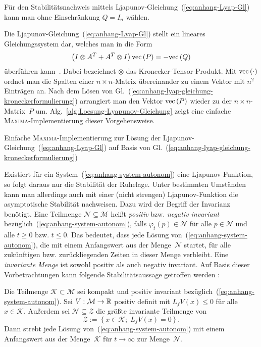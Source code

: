 Für den Stabilitätsnachweis mittels Ljapunov-Gleichung~(\ref{eq:anhang-Lyap-Gl})
kann man ohne Einschränkung $Q=I_{n}$ wählen.
\begin{remark}
Die Ljapunov-Gleichung~(\ref{eq:anhang-Lyap-Gl}) stellt ein lineares
Gleichungssystem dar, welches man in die Form 
\begin{equation}
\left(I\otimes A^{T}+A^{T}\otimes I\right){\mathrm{vec}\,}(P)=-{\mathrm{vec}\,}(Q)\label{eq:anhang-lyap-gleichung-kroneckerformulierung}
\end{equation}
überführen kann~\cite{marcusminc1992}. Dabei bezeichnet $\otimes$
das Kronecker-Tensor-Produkt. Mit ${\mathrm{vec}\,}(\cdot)$ ordnet man die Spalten
einer $n\times n$-Matrix übereinander zu einem Vektor mit $n^{2}$
Einträgen an. Nach dem Lösen von Gl.~(\ref{eq:anhang-lyap-gleichung-kroneckerformulierung})
arrangiert man den Vektor ${\mathrm{vec}\,}(P)$ wieder zu der $n\times n$-Matrix~$P$
um. Alg.~\ref{alg:Loesung-Lyapunov-Gleichung} zeigt eine einfache
\textsc{Maxima}-Implementierung dieser Vorgehensweise.
\end{remark}
\begin{algorithm}
\begin{raggedright}

\par\end{raggedright}
\caption{Einfache \textsc{Maxima}-Implementierung zur Lösung der Ljapunov-Gleichung~(\ref{eq:anhang-Lyap-Gl})\label{alg:Loesung-Lyapunov-Gleichung}
auf Basis von Gl.~(\ref{eq:anhang-lyap-gleichung-kroneckerformulierung})}

\end{algorithm}

Existiert für ein System~(\ref{eq:anhang-system-autonom}) eine Ljapunov-Funktion,
so folgt daraus nur die Stabilität der Ruhelage. Unter bestimmten
Umständen kann man allerdings auch mit einer (nicht strengen) Ljapunov-Funktion
die asymptotische Stabilität nachweisen. Dazu wird der Begriff der
Invarianz benötigt. Eine Teilmenge $\mathcal{N\subseteq\mathcal{M}}$
heißt \emph{positiv} bzw. \emph{negativ invariant} bezüglich~(\ref{eq:anhang-system-autonom}),
falls $\varphi_{t}(p)\in\mathcal{N}$ für alle $p\in\mathcal{N}$
und alle $t\geq0$ bzw. $t\leq0$. Das bedeutet, dass jede Lösung
von~(\ref{eq:anhang-system-autonom}), die mit einem Anfangswert
aus der Menge~$\mathcal{N}$ startet, für alle zukünftigen bzw. zurückliegenden
Zeiten in dieser Menge verbleibt. Eine \emph{invariante Menge}
ist sowohl positiv als auch negativ invariant. Auf Basis dieser Vorbetrachtungen
kann folgende Stabilitätsaussage getroffen werden \cite{slotine1991,khalil2002}:
\begin{theorem}
\label{thm:LaSalle}Die Teilmenge $\mathcal{K}\subset\mathcal{M}$
sei kompakt und positiv invariant bezüglich~(\ref{eq:anhang-system-autonom}).
Sei $V:\mathcal{M}\to{\mathbb{R}}$ positiv definit mit $L_{f}V(x)\leq0$ für
alle $x\in\mathcal{K}$. Außerdem sei $\mathcal{N}\subseteq\mathcal{Z}$
die größte invariante Teilmenge von 
\[
\mathcal{Z}:=\left\{ x\in\mathcal{K};\;L_{f}V(x)=0\right\} .
\]
Dann strebt jede Lösung von~(\ref{eq:anhang-system-autonom}) mit
einem Anfangswert aus der Menge~$\mathcal{K}$ für $t\to\infty$
zur Menge~$\mathcal{N}$.
\end{theorem}

